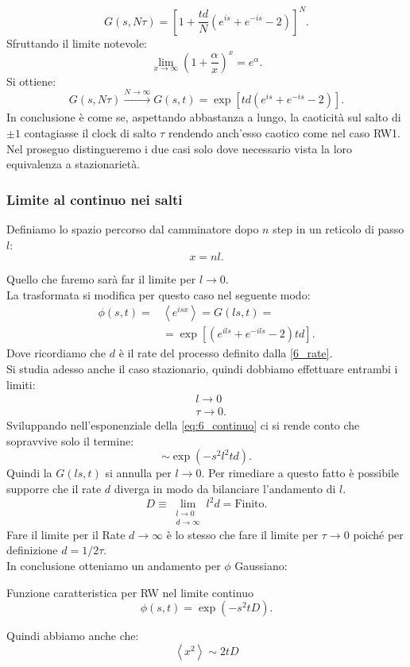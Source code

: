 \[
    G(s,N\tau) = \left[1 + \frac{td}{N}\left(e^{is}+ e^{-is}-2\right)\right]^N
.\] 
Sfruttando il limite notevole:
\[
    \lim_{x \to \infty} \left(1+\frac{\alpha}{x}\right)^{x} = e^{\alpha}
.\] 
Si ottiene:
\[
    G(s, N\tau) \xrightarrow[]{N \to \infty} G(s,t) = \exp\left[td\left(e^{is}+e^{-is}-2\right)\right]
.\] 
In conclusione è come se, aspettando abbastanza a lungo, la caoticità sul salto di $\pm 1$ contagiasse il clock di salto $\tau$ rendendo anch'esso caotico come nel caso RW1.\\
Nel proseguo distingueremo i due casi solo dove necessario vista la loro equivalenza a stazionarietà.

\subsubsection{Limite al continuo nei salti}%
\label{subsub:Limite al continuo}
Definiamo lo spazio percorso dal camminatore dopo $n$ step in un reticolo di passo $l$:
\[
    x = nl
.\] 

Quello che faremo sarà far il limite per $l\to 0$.\\
La trasformata si modifica per questo caso nel seguente modo:
\begin{equation}
\begin{aligned}
    \phi (s,t) = &\left<e^{isx}\right> = G(ls, t) =\\
		 & = \exp \left[\left(e^{ils} + e^{-ils} -2 \right)td\right]
		 \label{eq:6_continuo}
.\end{aligned}
\end{equation}
Dove ricordiamo che $d$ è il rate del processo definito dalla \ref{6_rate}.\\
Si studia adesso anche il caso stazionario, quindi dobbiamo effettuare entrambi i limiti:
\[\begin{aligned}
    &l\to 0\\
    &\tau\to 0
.\end{aligned}\]
Sviluppando nell'esponenziale della \ref{eq:6_continuo} ci si rende conto che sopravvive solo il termine:
\[
    \sim \exp\left(-s^2l^2td\right)
.\] 
Quindi la $G(ls, t)$ si annulla per $l \to 0$. Per rimediare a questo fatto è possibile supporre che il rate $d$ diverga in modo da bilanciare l'andamento di $l$.
\[
    D \equiv \lim \limits_{\substack{%
	         l \to 0\\
		  d \to \infty}} l^2d = \text{Finito}
.\] 
Fare il limite per il Rate $d\to \infty$ è lo stesso che fare il limite per $\tau\to 0$ poiché per definizione $d = 1 /2\tau$.\\
In conclusione otteniamo un andamento per $\phi$ Gaussiano:
\begin{bluebox}{Funzione caratteristica per RW nel limite continuo}
\[
    \phi (s,t) = \exp\left(-s^2tD\right)
.\]     
\end{bluebox}
\noindent
Quindi abbiamo anche che:
\begin{equation}
    \left<x^2\right> \sim  2tD \label{eq:6_mom_sec}
\end{equation}
